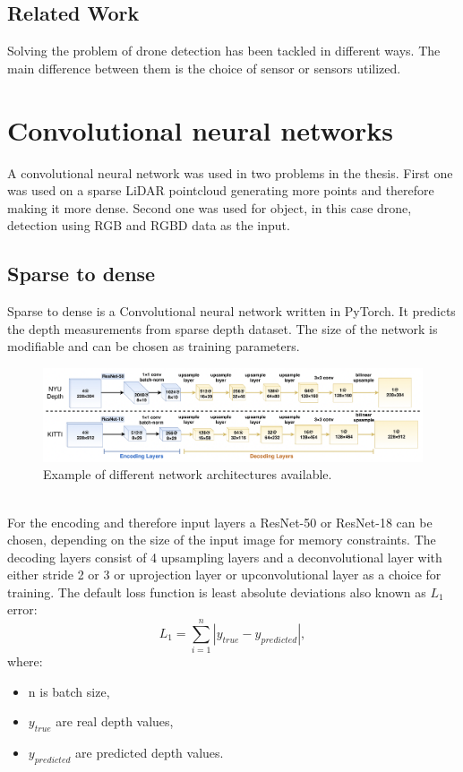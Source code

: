 \documentclass[twoside]{ctuthesis}
\theoremstyle{plain}
\theoremstyle{definition}
\theoremstyle{note}
\begin{document}
\section{Related Work}
Solving the problem of drone detection has been tackled in different ways. The main difference between them is the choice of sensor or sensors utilized. 
\chapter{Convolutional neural networks}
A convolutional neural network was used in two problems in the thesis. First one was used on a sparse LiDAR pointcloud generating more points and therefore making it more dense. Second one was used for object, in this case drone, detection using RGB and RGBD data as the input.
\section{Sparse to dense}
Sparse to dense is a Convolutional neural network written in PyTorch. It predicts the depth measurements from sparse depth dataset. The size of the network is modifiable and can be chosen as training parameters.
\begin{figure}[h!]
	\caption{Example of different network architectures available.}
	\includegraphics[width=\textwidth]{sparse2dense.png}
	\centering
\end{figure}\\
For the encoding and therefore input layers a ResNet-50 or ResNet-18 can be chosen, depending on the size of the input image for memory constraints. The decoding layers consist of 4 upsampling layers and a deconvolutional layer with either stride 2 or 3 or uprojection layer or upconvolutional layer as a choice for training. The default loss function is least absolute deviations also known as $L_1$ error:
\begin{equation}
	L_1=\sum_{i=1}^{n}|y_{true}-y_{predicted}|,
\end{equation}
where:
\begin{itemize}
	\item n is batch size,
	\item $y_{true}$ are real depth values,
	\item $y_{predicted}$ are predicted depth values.
\end{itemize}
\end{document}
